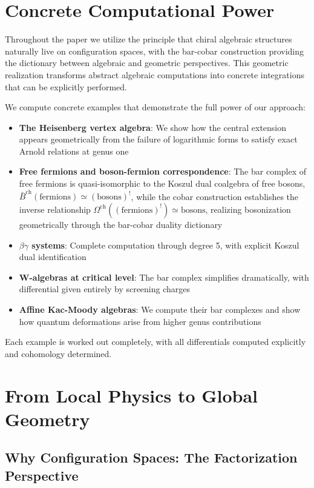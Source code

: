 \section{Concrete Computational Power}

Throughout the paper we utilize the principle that chiral algebraic structures naturally live on configuration spaces, with the bar-cobar construction providing the dictionary between algebraic and geometric perspectives. This geometric realization transforms abstract algebraic computations into concrete integrations that can be explicitly performed. 

We compute concrete examples that demonstrate the full power of our approach:
\begin{itemize}
\item \textbf{The Heisenberg vertex algebra}: We show how the central extension appears geometrically from the failure of logarithmic forms to satisfy exact Arnold relations at genus one
\item \textbf{Free fermions and boson-fermion correspondence}: The bar complex of free fermions is quasi-isomorphic to the Koszul dual coalgebra of free bosons, $\bar{B}^{\text{ch}}(\text{fermions}) \simeq (\text{bosons})^!$, while the cobar construction establishes the inverse relationship $\Omega^{\text{ch}}((\text{fermions})^!) \simeq \text{bosons}$, realizing bosonization geometrically through the bar-cobar duality dictionary
\item \textbf{$\beta\gamma$ systems}: Complete computation through degree 5, with explicit Koszul dual identification
\item \textbf{W-algebras at critical level}: The bar complex simplifies dramatically, with differential given entirely by screening charges
\item \textbf{Affine Kac-Moody algebras}: We compute their bar complexes and show how quantum deformations arise from higher genus contributions
\end{itemize}

Each example is worked out completely, with all differentials computed explicitly and cohomology determined.

\section{From Local Physics to Global Geometry}


\subsection{Why Configuration Spaces: The Factorization Perspective}

